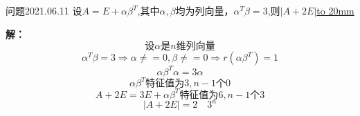 \begin{mybox}{问题2021.06.11}
	\qquad 设$A=E+\alpha \beta^T$,其中$\alpha,\beta$均为列向量，$\alpha^T\beta=3$,则$\left| A+2E\right|$\underline{\hbox to 20mm{}}
\end{mybox}	
\noindent
\textbf{解：}
$$\text{设}\alpha \text{是}n\text{维列向量}$$
$$\alpha^T \beta=3 \Rightarrow \alpha\neq=0 ,\beta \neq=0\Rightarrow r(\alpha\beta^T)=1$$
$$\alpha \beta ^T \alpha=3\alpha$$
$$\alpha \beta ^T \text{特征值为}3,n-1\text{个} 0$$
$$A+2E=3E+\alpha \beta ^T \text{特征值为}6,n-1\text{个} 3$$
$$\left| A+2E\right|=2\quad 3^n$$